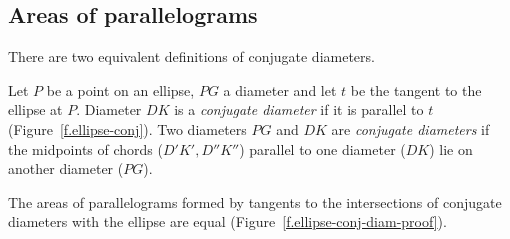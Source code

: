 \vspace*{-5ex}


\subsection{Areas of parallelograms}

There are two equivalent definitions of conjugate diameters.

\begin{definition}\label{def.conjugate}\mbox{}
Let $P$ be a point on an ellipse, $PG$ a diameter and let $t$ be the tangent to the ellipse at $P$. Diameter $DK$ is a \emph{conjugate diameter} if it is parallel to $t$ (Figure~\ref{f.ellipse-conj}). Two diameters $PG$ and $DK$ are \emph{conjugate diameters} if the midpoints of chords ($D'K', D''K''$) parallel to one diameter ($DK$) lie on another diameter ($PG$).
\end{definition}

\vspace*{-3ex}

\begin{theorem}\label{thm.conj-diam-para}
The areas of parallelograms formed by tangents to the intersections of conjugate diameters with the ellipse are equal (Figure~\ref{f.ellipse-conj-diam-proof}).
\end{theorem}


